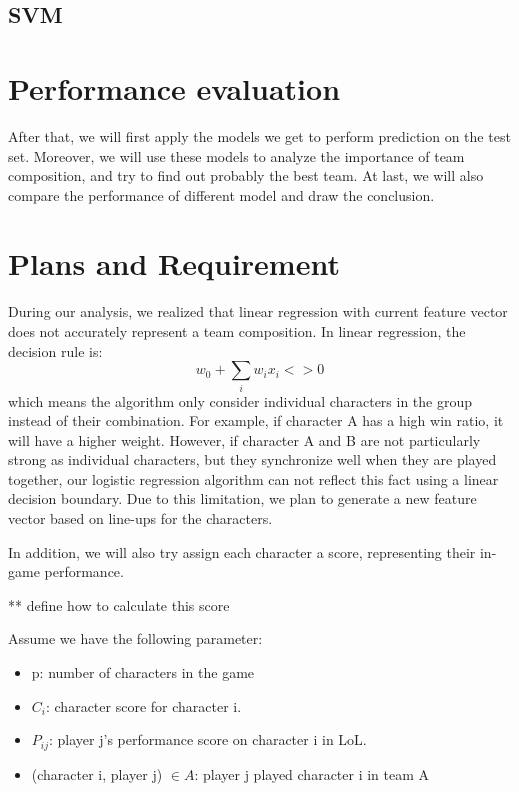 \documentclass[conference]{IEEEtran}
\begin{document}
\subsection{SVM}


\section{Performance evaluation}

After that, we will first apply the models we get to perform prediction on the test set. Moreover, we will use these models to analyze the importance of team composition, and try to find out probably the best team. At last, we will also compare the performance of different model and draw the conclusion.


\section{Plans and Requirement}

During our analysis, we realized that linear regression with current feature vector does not accurately represent a team composition. In linear regression, the decision rule is:
\[
w_0 + \sum_i w_i x_i <>0
\]
which means the algorithm only consider individual characters in the group instead of their combination. For example, if character A has a high win ratio, it will have a higher weight. However, if character A and B are not particularly strong as individual characters, but they synchronize well when they are played together, our logistic regression algorithm can not reflect this fact using a linear decision boundary. Due to this limitation, we plan to generate a new feature vector based on line-ups for the characters.

In addition, we will also try assign each character a score, representing their in-game performance.

** define how to calculate this score

Assume we have the following parameter:
\begin{itemize}
\item p: number of characters in the game
\item $C_i$: character score for character i.
\item $P_{ij}$: player j's performance score on character i in LoL.
\item (character i, player j) $\in A$: player j played character i in team A

\end{itemize}
\end{document}
